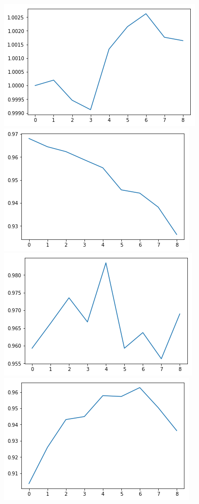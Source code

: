 \begin{figure}[hbt!]
    \centering
    \includegraphics[scale=0.3]{fig/Start_it_100.png}
    \includegraphics[scale = 0.3]{fig/1000_it_100.png}
    \includegraphics[scale = 0.3]{fig/2000_it_100.png}\\
    \includegraphics[scale = 0.3]{fig/3000_it_100.png}

\end{figure}
